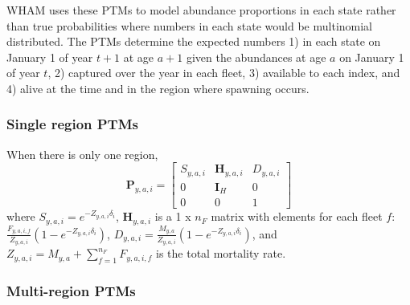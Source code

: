 \documentclass[
]{article}
\begin{document}
WHAM uses these PTMs to model abundance proportions in each state rather
than true probabilities where numbers in each state would be multinomial
distributed. The PTMs determine the expected numbers 1) in each state on
January 1 of year \(t+1\) at age \(a+1\) given the abundances at age
\(a\) on January 1 of year \(t\), 2) captured over the year in each
fleet, 3) available to each index, and 4) alive at the time and in the
region where spawning occurs.

\hypertarget{single-region-ptms}{%
\subsubsection*{Single region PTMs}\label{single-region-ptms}}

When there is only one region, \begin{equation}\label{eq:ptm_1_region}
\mathbf{P}_{y,a,i} = 
  \begin{bmatrix}
     S_{y,a,i} & \mathbf{H}_{y,a,i} & D_{y,a,i} \\
     0 & \mathbf{I}_{H} & 0\\
     0 & 0 & 1
  \end{bmatrix}
\end{equation} where \(S_{y,a,i} = e^{-Z_{y,a,i}\delta_i}\),
\(\mathbf{H}_{y,a,i}\) is a 1 x \(n_F\) matrix with elements for each
fleet \(f\):
\(\frac{F_{y,a,i,f}}{Z_{y,a,i}}\left(1 - e^{-Z_{y,a,i}\delta_i}\right)\),
\(D_{y,a,i} = \frac{M_{y,a}}{Z_{y,a,i}}\left(1 - e^{-Z_{y,a,i}\delta_i}\right)\),
and \(Z_{y,a,i} = M_{y,a} + \sum^{n_F}_{f=1} F_{y,a,i,f}\) is the total
mortality rate.

\hypertarget{multi-region-ptms}{%
\subsubsection*{Multi-region PTMs}\label{multi-region-ptms}}
\end{document}
